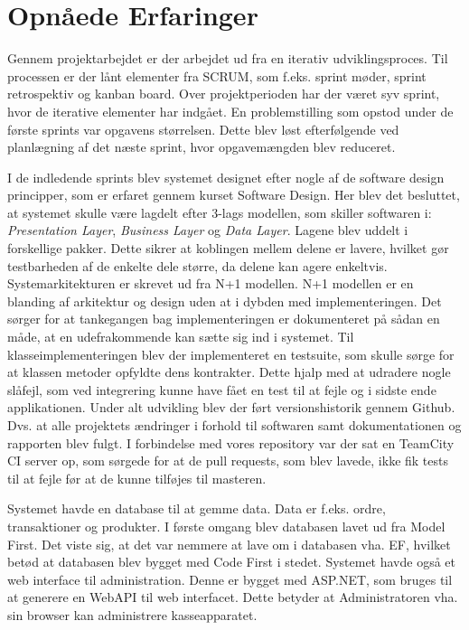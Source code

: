 \section{Opnåede Erfaringer}
Gennem projektarbejdet er der arbejdet ud fra en iterativ udviklingsproces. Til processen er der lånt elementer fra SCRUM, som f.eks. sprint møder, sprint retrospektiv og kanban board. Over projektperioden har der været syv sprint, hvor de iterative elementer har indgået. En problemstilling som opstod under de første sprints var opgavens størrelsen. Dette blev løst efterfølgende ved planlægning af det næste sprint, hvor opgavemængden blev reduceret.

\newline\newline
I de indledende sprints blev systemet designet efter nogle af de software design principper, som er erfaret gennem kurset Software Design. Her blev det besluttet, at systemet skulle være lagdelt efter 3-lags modellen, som skiller softwaren i: \textit{Presentation Layer}, \textit{Business Layer} og \textit{Data Layer}. Lagene blev uddelt i forskellige pakker. Dette sikrer at koblingen mellem delene er lavere, hvilket gør testbarheden af de enkelte dele større, da delene kan agere enkeltvis.
\newline\newline
Systemarkitekturen er skrevet ud fra N+1 modellen. N+1 modellen er en blanding af arkitektur og design uden at i dybden med implementeringen. Det sørger for at tankegangen bag implementeringen er dokumenteret på sådan en måde, at en udefrakommende kan sætte sig ind i systemet.
\newline\newline 
Til klasseimplementeringen blev der implementeret en testsuite, som skulle sørge for at klassen metoder opfyldte dens kontrakter. Dette hjalp med at udradere nogle slåfejl, som ved integrering kunne have fået en test til at fejle og i sidste ende applikationen.
\newline\newline
Under alt udvikling blev der ført versionshistorik gennem Github. Dvs. at alle projektets ændringer i forhold til softwaren samt dokumentationen og rapporten blev fulgt. I forbindelse med vores repository var der sat en TeamCity CI server op, som sørgede for at de pull requests, som blev lavede, ikke fik tests til at fejle før at de kunne tilføjes til masteren.

\newline\newline
Systemet havde en database til at gemme data. Data er f.eks. ordre, transaktioner og produkter. I første omgang blev databasen lavet ud fra Model First. Det viste sig, at det var nemmere at lave om i databasen vha. EF, hvilket betød at databasen blev bygget med Code First i stedet.
\newline\newline
Systemet havde også et web interface til administration. Denne er bygget med ASP.NET, som bruges til at generere en WebAPI til web interfacet. Dette betyder at Administratoren vha. sin browser kan administrere kasseapparatet.
